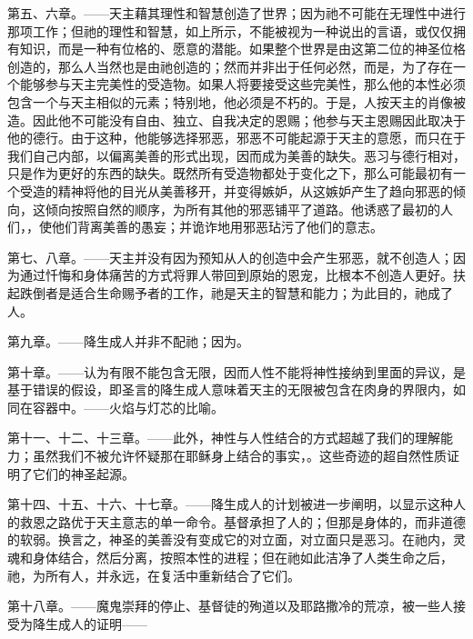 第五、六章。——天主藉其理性和智慧创造了世界；因为祂不可能在无理性中进行那项工作；但祂的理性和智慧，如上所示，不能被视为一种说出的言语，或仅仅拥有知识，而是一种有位格的、愿意的潜能。如果整个世界是由这第二位的神圣位格创造的，那么人当然也是由祂创造的；然而并非出于任何必然，而是，为了存在一个能够参与天主完美性的受造物。如果人将要接受这些完美性，那么他的本性必须包含一个与天主相似的元素；特别地，他必须是不朽的。于是，人按天主的肖像被造。因此他不可能没有自由、独立、自我决定的恩赐；他参与天主恩赐因此取决于他的德行。由于这种，他能够选择邪恶，邪恶不可能起源于天主的意愿，而只在于我们自己内部，以偏离美善的形式出现，因而成为美善的缺失。恶习与德行相对，只是作为更好的东西的缺失。既然所有受造物都处于变化之下，那么可能最初有一个受造的精神将他的目光从美善移开，并变得嫉妒，从这嫉妒产生了趋向邪恶的倾向，这倾向按照自然的顺序，为所有其他的邪恶铺平了道路。他诱惑了最初的人们，，使他们背离美善的愚妄；并诡诈地用邪恶玷污了他们的意志。\par

第七、八章。——天主并没有因为预知从人的创造中会产生邪恶，就不创造人；因为通过忏悔和身体痛苦的方式将罪人带回到原始的恩宠，比根本不创造人更好。扶起跌倒者是适合生命赐予者的工作，祂是天主的智慧和能力；为此目的，祂成了人。\par

第九章。——降生成人并非不配祂；因为。\par

第十章。——认为有限不能包含无限，因而人性不能将神性接纳到里面的异议，是基于错误的假设，即圣言的降生成人意味着天主的无限被包含在肉身的界限内，如同在容器中。——火焰与灯芯的比喻。\par

第十一、十二、十三章。——此外，神性与人性结合的方式超越了我们的理解能力；虽然我们不被允许怀疑那在耶稣身上结合的事实，。这些奇迹的超自然性质证明了它们的神圣起源。\par

第十四、十五、十六、十七章。——降生成人的计划被进一步阐明，以显示这种人的救恩之路优于天主意志的单一命令。基督承担了人的；但那是身体的，而非道德的软弱。换言之，神圣的美善没有变成它的对立面，对立面只是恶习。在祂内，灵魂和身体结合，然后分离，按照本性的进程；但在祂如此洁净了人类生命之后，祂，为所有人，并永远，在复活中重新结合了它们。\par

第十八章。——魔鬼崇拜的停止、基督徒的殉道以及耶路撒冷的荒凉，被一些人接受为降生成人的证明——\par

